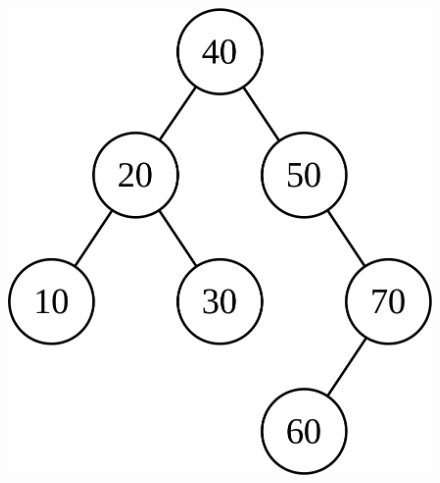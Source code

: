 \documentclass[aspectratio=169]{beamer}
\begin{document}
\begin{frame}
\begin{columns}[T]
\begin{column}{0.5\linewidth}
\begin{figure}[h]
	\includegraphics[height=0.5\paperheight]{imagens/avl03.png}\\~
\end{figure}
\end{column}
\end{columns}
\end{frame}
\end{document}
